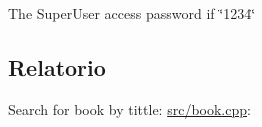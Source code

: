 


\begin{DoxyItemize}
\item The Super\+User access password if \char`\"{}1234\char`\"{}
\end{DoxyItemize}

\subsection*{Relatorio}


\begin{DoxyItemize}
\item Search for book by tittle\+: \hyperlink{book_8cpp}{src/book.\+cpp}\+: 
\end{DoxyItemize}